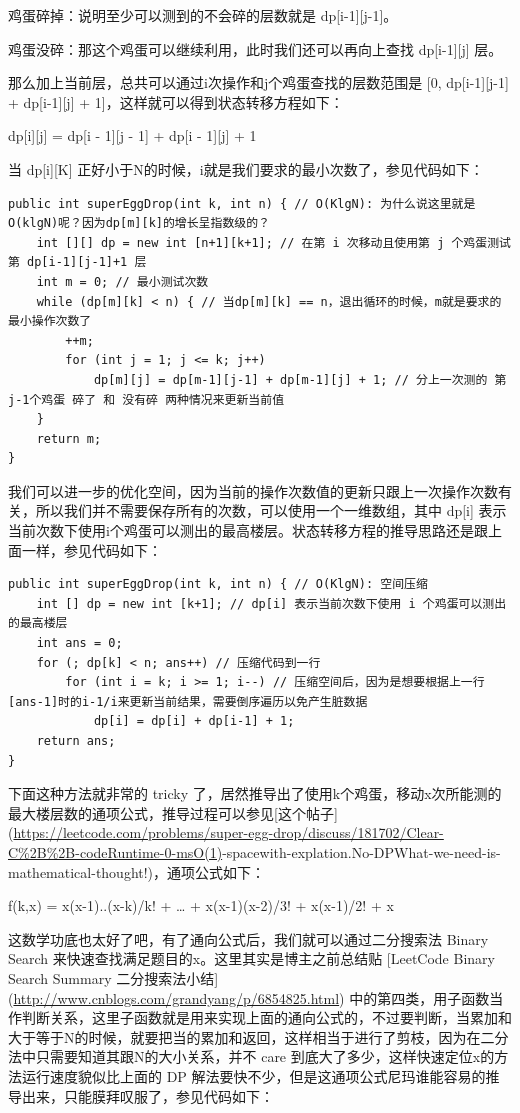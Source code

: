 \documentclass[9pt, b5paaper]{book}
\begin{document}
\begin{enumerate}
鸡蛋碎掉：说明至少可以测到的不会碎的层数就是 dp[i-1][j-1]。

鸡蛋没碎：那这个鸡蛋可以继续利用，此时我们还可以再向上查找 dp[i-1][j] 层。

那么加上当前层，总共可以通过i次操作和j个鸡蛋查找的层数范围是 [0, dp[i-1][j-1] + dp[i-1][j] + 1]，这样就可以得到状态转移方程如下：

dp[i][j] = dp[i - 1][j - 1] + dp[i - 1][j] + 1

当 dp[i][K] 正好小于N的时候，i就是我们要求的最小次数了，参见代码如下：

\begin{verbatim}
public int superEggDrop(int k, int n) { // O(KlgN): 为什么说这里就是 O(klgN)呢？因为dp[m][k]的增长呈指数级的？
    int [][] dp = new int [n+1][k+1]; // 在第 i 次移动且使用第 j 个鸡蛋测试第 dp[i-1][j-1]+1 层
    int m = 0; // 最小测试次数
    while (dp[m][k] < n) { // 当dp[m][k] == n，退出循环的时候，m就是要求的最小操作次数了
        ++m;
        for (int j = 1; j <= k; j++) 
            dp[m][j] = dp[m-1][j-1] + dp[m-1][j] + 1; // 分上一次测的 第j-1个鸡蛋 碎了 和 没有碎 两种情况来更新当前值
    }
    return m;
}
\end{verbatim}

我们可以进一步的优化空间，因为当前的操作次数值的更新只跟上一次操作次数有关，所以我们并不需要保存所有的次数，可以使用一个一维数组，其中 dp[i] 表示当前次数下使用i个鸡蛋可以测出的最高楼层。状态转移方程的推导思路还是跟上面一样，参见代码如下：
\begin{verbatim}
public int superEggDrop(int k, int n) { // O(KlgN): 空间压缩
    int [] dp = new int [k+1]; // dp[i] 表示当前次数下使用 i 个鸡蛋可以测出的最高楼层
    int ans = 0;
    for (; dp[k] < n; ans++) // 压缩代码到一行
        for (int i = k; i >= 1; i--) // 压缩空间后，因为是想要根据上一行[ans-1]时的i-1/i来更新当前结果，需要倒序遍历以免产生脏数据
            dp[i] = dp[i] + dp[i-1] + 1;
    return ans;
}
\end{verbatim}

下面这种方法就非常的 tricky 了，居然推导出了使用k个鸡蛋，移动x次所能测的最大楼层数的通项公式，推导过程可以参见[这个帖子](\url{https://leetcode.com/problems/super-egg-drop/discuss/181702/Clear-C\%2B\%2B-codeRuntime-0-msO(1)}-spacewith-explation.No-DPWhat-we-need-is-mathematical-thought!)，通项公式如下：

f(k,x) = x(x-1)..(x-k)/k! + \ldots{} + x(x-1)(x-2)/3! + x(x-1)/2! + x

这数学功底也太好了吧，有了通向公式后，我们就可以通过二分搜索法 Binary Search 来快速查找满足题目的x。这里其实是博主之前总结贴 [LeetCode Binary Search Summary 二分搜索法小结](\url{http://www.cnblogs.com/grandyang/p/6854825.html}) 中的第四类，用子函数当作判断关系，这里子函数就是用来实现上面的通向公式的，不过要判断，当累加和大于等于N的时候，就要把当的累加和返回，这样相当于进行了剪枝，因为在二分法中只需要知道其跟N的大小关系，并不 care 到底大了多少，这样快速定位x的方法运行速度貌似比上面的 DP 解法要快不少，但是这通项公式尼玛谁能容易的推导出来，只能膜拜叹服了，参见代码如下：


\end{enumerate}
\end{document}
